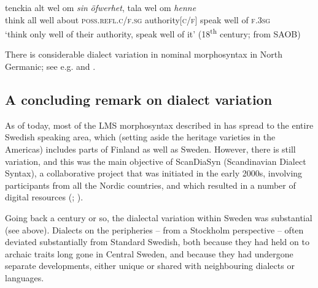 \documentclass[output=paper]{langscibook}
\begin{document}
\ex\label{ex:intro:38b}
\gll  tenckia   alt wel   om \textit{sin} \textit{öfwerhet},        tala    wel om \textit{henne}\\
think   all well  about \textsc{poss.refl.c/f.sg} authority[\textsc{c/f}]  speak well of  \textsc{f.3sg}\\
\glt ‘think only well of their authority, speak well of it’ (18\textsuperscript{th} century; from SAOB)
\z
\z

There is considerable dialect variation in nominal morphosyntax in North Germanic; see e.g. \citet{Delsing2003} and \citet{Dahl2015}.


\subsection{A concluding remark on dialect variation}\label{sec:intro:3.5}


As of today, most of the LMS morphosyntax described in  has spread to the entire Swedish speaking area, which (setting aside the heritage varieties in the Americas) includes parts of Finland as well as Sweden. However, there is still variation, and this was the main objective of ScanDiaSyn (Scandinavian Dialect Syntax), a collaborative project that was initiated in the early 2000s, involving participants from all the Nordic countries, and which resulted in a number of digital resources (\citealt{JohannessenEtAl2009}; \citealt{LindstadEtAl2009}).



Going back a century or so, the dialectal variation within Sweden was substantial (see  above). Dialects on the peripheries – from a Stockholm perspective – often deviated substantially from Standard Swedish, both because they had held on to archaic traits long gone in Central Sweden, and because they had undergone separate developments, either unique or shared with neighbouring dialects or languages.
\end{document}
